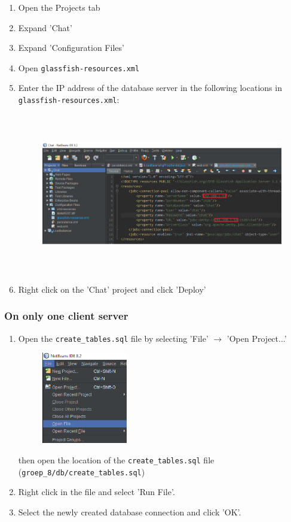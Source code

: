 \documentclass[11pt]{article}
\begin{document}
\begin{enumerate}
	
	\item Open the Projects tab
	\item Expand 'Chat'
	\item Expand 'Configuration Files'
	\item Open \texttt{glassfish-resources.xml}
	\item Enter the IP address of the database server in the following locations in \texttt{glassfish-resources.xml}:
	\begin{figure}[H]
		\centering
		\includegraphics[height=70mm]{enter_db_ip_gf_resources.png}
	\end{figure}
	\item Right click on the 'Chat' project and click 'Deploy'
\end{enumerate}
\subsubsection{On only one client server}
\begin{enumerate}
	\item Open the \texttt{create\_tables.sql} file by selecting 'File' $\rightarrow$ 'Open Project...'
	\begin{figure}[H]
		\centering
		\includegraphics[height=40mm]{open_file.png}
	\end{figure}
	then open the location of the \texttt{create\_tables.sql} file (\texttt{groep\_8/db/create\_tables.sql})
	\item Right click in the file and select 'Run File'.
	\item Select the newly created database connection and click 'OK'.
\end{enumerate}
\end{document}
